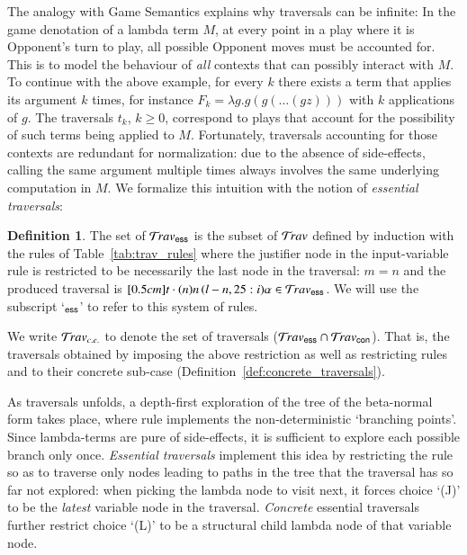 \documentclass{elsarticle}
\theoremstyle{plain}
\theoremstyle{definition}
\newtheorem{definition}{Definition}[section]
\newcommand\Nodes{\mathcal{N}}%
\newcommand\NodesVar{\Nodes_{\sf var}}%
\newcommand{\essential}{{\sf ess}}
\newcommand{\concrete}{{\sf con}}
\newcommand{\travsetes}{{\travset_\essential}}
\newcommand{\travsetcon}{{\travset_\concrete}}
\newcommand{\travsetcones}{{\travset_{c.e.}}} %
\newcommand{\travulc}{\travset}
\newcommand{\rulefont}[1]{\mathbf{\sf #1}}
\newcommand{\enables}{\vdash} %
\newcommand{\ExternalNodes}{\Nodes^{\sf ext}}
\begin{document}
The analogy with Game Semantics explains why traversals can be infinite: In the game denotation of a lambda term $M$, at every point in a play where it is Opponent's turn to play, all possible Opponent moves must be accounted for.
This is to model the behaviour of \emph{all} contexts that can possibly interact with $M$. To continue with the above example, for every $k$ there exists a term that applies its argument $k$ times, for instance $F_k = \lambda g . g (g ( \ldots (g z)))$ with $k$ applications of $g$.
The traversals $t_k$, $k\geq 0$, correspond to plays
 that account for the possibility of
 such terms being applied to $M$. Fortunately, traversals accounting for those contexts are redundant for normalization: due to the absence of side-effects, calling the same argument multiple times always involves the same underlying computation in $M$. We formalize this intuition with the notion of \emph{essential traversals}:

\begin{definition}
\label{dfn:essential_traversals}
The set of  $\travsetes$ is the subset of $\travulc$ defined by induction with the rules of Table~\ref{tab:trav_rules} where the justifier node in the
input-variable rule  is restricted to be necessarily the last node in the traversal: $m=n$ and the produced traversal is $\Pstr[0.5cm]{t \cdot (n){n} \, (l-n,25:i){\alpha}} \in \travsetes$.
We will use the subscript `${}_\essential$' to refer to this system of rules.

We write $\travsetcones$ to denote the set of
 traversals ($\travsetes \inter \travsetcon$).
 That is, the traversals obtained by imposing the above restriction as well as restricting rules  and  to their concrete sub-case (Definition~\ref{def:concrete_traversals}).
\end{definition}

As traversals unfolds, a depth-first exploration of the tree of the beta-normal form takes place, where rule  implements the non-deterministic `branching points'. Since lambda-terms are pure of side-effects,
it is sufficient to explore each possible branch only once.
\emph{Essential traversals} implement this idea by restricting the rule  so as to traverse only nodes leading to paths in the tree that the traversal has so far not explored: when picking the lambda node to visit next, it forces choice `(J)' to be the \emph{latest} variable node in the traversal. \emph{Concrete} essential traversals further restrict choice `(L)' to be a structural child lambda node of that variable node.
\end{document}
